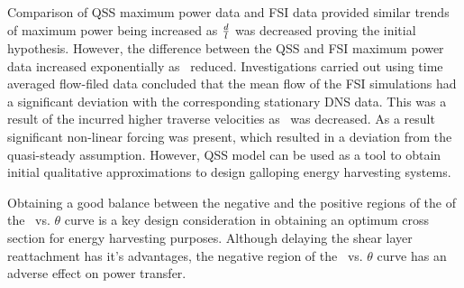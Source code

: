 Comparison of QSS maximum power data and FSI data provided similar trends of maximum power being increased as $\frac{d}{l}$ was decreased proving the initial hypothesis. However, the difference between the QSS and FSI maximum power data increased exponentially as \ratio\ reduced. Investigations carried out using time averaged flow-filed data concluded that the mean flow of the FSI simulations had a significant deviation with the corresponding stationary DNS data. This was a result of the incurred higher  traverse velocities as \ratio\ was decreased. As a result significant non-linear forcing was present, which resulted in a deviation from the quasi-steady assumption. However, QSS model can be used as a tool to obtain initial qualitative approximations to design galloping energy harvesting systems. 

Obtaining a good balance between the negative and the positive regions of the of the \cy\ vs. $\theta$ curve is a key design consideration in obtaining an optimum cross section for energy harvesting purposes. Although delaying the shear layer reattachment has it's advantages, the negative region of the \cy\ vs. $\theta$ curve has an adverse effect on power transfer. 








  

